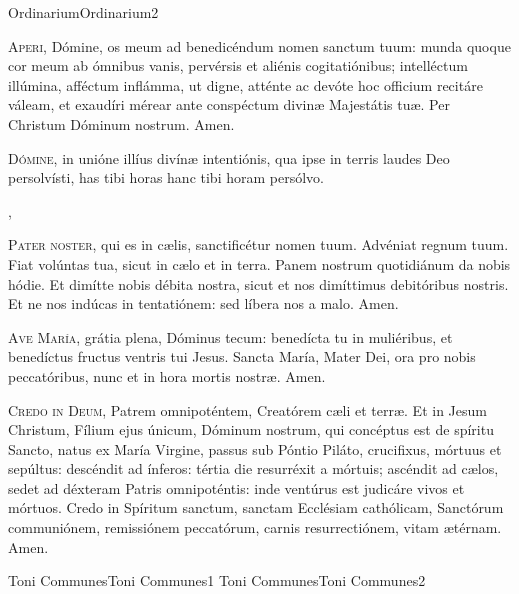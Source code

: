 \documentclass[invitatoriale-romanum.tex]{subfiles}
\begin{document}
	{Ordinarium}{Ordinarium}{2}{}{}{}{}{}{}

\begin{multicols}{2}
\lettrine{A}{peri}, Dómine, os meum ad benedicéndum nomen sanctum tuum:
munda quoque cor meum ab ómnibus vanis, pervérsis et aliénis cogitatiónibus; 
intelléctum illúmina, afféctum inflámma, ut digne, atténte ac devóte
hoc officium recitáre váleam, et exaudíri mérear
ante conspéctum divinæ Majestátis tuæ. Per Christum Dóminum nostrum. Amen.

\vspace{\baselineskip}
\lettrine{D}{ómine}, in unióne illíus divínæ intentiónis,
qua ipse in terris laudes Deo persolvísti,
has tibi horas  hanc tibi horam\rubric{)} persólvo.
\end{multicols}

\sep

\begin{multicols}{2}
\lettrine{P}{ater noster}, qui es in cælis, sanctificétur nomen tuum.
Advéniat regnum tuum. Fiat volúntas tua, sicut in cælo et in terra.
Panem nostrum quotidiánum da nobis hódie.
Et dimítte nobis débita nostra, sicut et nos dimíttimus debitóribus nostris.
Et ne nos indúcas in tentatiónem: sed líbera nos a malo. Amen.

\vspace{\baselineskip}
\lettrine{A}{ve María}, grátia plena, Dóminus tecum:
benedícta tu in muliéribus, et benedíctus fructus ventris tui Jesus.
Sancta María, Mater Dei, ora pro nobis peccatóribus,
nunc et in hora mortis nostræ. Amen.

\lettrine{C}{redo in Deum}, Patrem omnipoténtem, Creatórem cæli et terræ.
Et in Jesum Christum, Fílium ejus únicum, Dóminum nostrum,
qui concéptus est de spíritu Sancto, natus ex María Virgine,
passus sub Póntio Piláto, crucifixus, mórtuus et sepúltus:
descéndit ad ínferos: tértia die resurréxit a mórtuis;
ascéndit ad cælos, sedet ad déxteram Patris omnipoténtis:
inde ventúrus est judicáre vivos et mórtuos.
Credo in Spíritum sanctum, sanctam Ecclésiam cathólicam,
Sanctórum communiónem, remissiónem peccatórum,
carnis resurrectiónem, vitam ætérnam. Amen.
\end{multicols}

\pagebreak

	{Toni Communes}{Toni Communes}{1}{}{}{}{}{}{}
\vspace{-6mm}
	{Toni Communes}{Toni Communes}{2}{}{}{}{}{}{}
\end{document}

